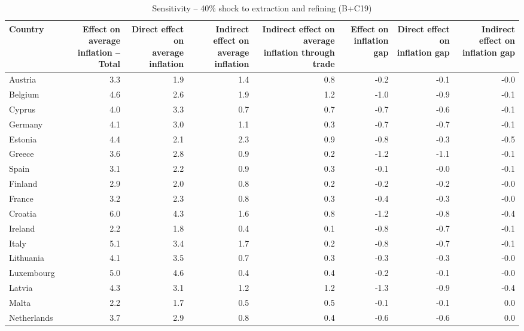 \documentclass[11pt]{article}
\begin{document}
\setcounter{table}{4}
\begin{table}[H]
\centering
\caption{Sensitivity -- 40\% shock to extraction and refining (B+C19)}
\scriptsize
\setlength{\tabcolsep}{1.2pt}
\begin{tabular}{lrrrrrrr}
\toprule
Country & \shortstack{Effect on average\\inflation -- Total} & \shortstack{Direct effect on\\average inflation} & \shortstack{Indirect effect on\\average inflation} & \shortstack{Indirect effect on average\\inflation through trade} & \shortstack{Effect on\\inflation gap} & \shortstack{Direct effect on\\inflation gap} & \shortstack{Indirect effect on\\inflation gap}
 \\
\midrule
Austria & 3.3 & 1.9 & 1.4 & 0.8 & -0.2 & -0.1 & -0.0
 \\
Belgium & 4.6 & 2.6 & 1.9 & 1.2 & -1.0 & -0.9 & -0.1
 \\
Cyprus & 4.0 & 3.3 & 0.7 & 0.7 & -0.7 & -0.6 & -0.1
 \\
Germany & 4.1 & 3.0 & 1.1 & 0.3 & -0.7 & -0.7 & -0.1
 \\
Estonia & 4.4 & 2.1 & 2.3 & 0.9 & -0.8 & -0.3 & -0.5
 \\
Greece & 3.6 & 2.8 & 0.9 & 0.2 & -1.2 & -1.1 & -0.1
 \\
Spain & 3.1 & 2.2 & 0.9 & 0.3 & -0.1 & -0.0 & -0.1
 \\
Finland & 2.9 & 2.0 & 0.8 & 0.2 & -0.2 & -0.2 & -0.0
 \\
France & 3.2 & 2.3 & 0.8 & 0.3 & -0.4 & -0.3 & -0.0
 \\
Croatia & 6.0 & 4.3 & 1.6 & 0.8 & -1.2 & -0.8 & -0.4
 \\
Ireland & 2.2 & 1.8 & 0.4 & 0.1 & -0.8 & -0.7 & -0.1
 \\
Italy & 5.1 & 3.4 & 1.7 & 0.2 & -0.8 & -0.7 & -0.1
 \\
Lithuania & 4.1 & 3.5 & 0.7 & 0.3 & -0.3 & -0.3 & -0.0
 \\
Luxembourg & 5.0 & 4.6 & 0.4 & 0.4 & -0.2 & -0.1 & -0.0
 \\
Latvia & 4.3 & 3.1 & 1.2 & 1.2 & -1.3 & -0.9 & -0.4
 \\
Malta & 2.2 & 1.7 & 0.5 & 0.5 & -0.1 & -0.1 & 0.0
 \\
Netherlands & 3.7 & 2.9 & 0.8 & 0.4 & -0.6 & -0.6 & 0.0
 \\

\end{tabular}
\end{table}
\end{document}
